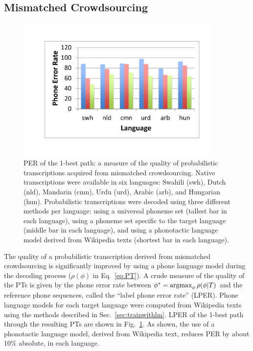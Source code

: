 \subsection{Mismatched Crowdsourcing}
\label{s6:mc}

\begin{figure}
  \centerline{\includegraphics[width=4in]{../figs/lm_results.pdf}}
  \caption{PER of the 1-best path: a measure of the quality of
    probabilistic transcriptions acquired from mismatched
    crowdsourcing.  Native transcriptions were available in six
    languages: Swahili (swh), Dutch (nld), Mandarin (cmn), Urdu (urd),
    Arabic (arb), and Hungarian (hun).  Probabilistic transcriptions
    were decoded using three different methods per language: using a
    universal phoneme set (tallest bar in each language), using a
    phoneme set specific to the target language (middle bar in each
    language), and using a phonotactic language model derived from
    Wikipedia texts (shortest bar in each language).}
  \label{fig:pt_decode_per}
\end{figure}

The quality of a probabilistic transcription derived from mismatched
crowdsourcing is significantly improved by using a phone language
model during the decoding process ($\rho(\phi)$ in Eq.~\ref{eq:PT}).
A crude measure of the quality of the PTs is given by the phone error
rate between $\phi^* = \operatorname*{argmax}_{\phi} \rho(\phi|T)$ and the reference
phone sequences, called the ``label phone error rate'' (LPER). Phone
language models for each target language were computed from Wikipedia
texts using the methods described in Sec.~\ref{sec:trainwithlm}.
LPER of the 1-best path through the resulting PTs are shown in
Fig.~\ref{fig:pt_decode_per}.  As shown, the use of a phonotactic
language model, derived from Wikipedia text, reduces PER by about 10\%
absolute, in each language.


